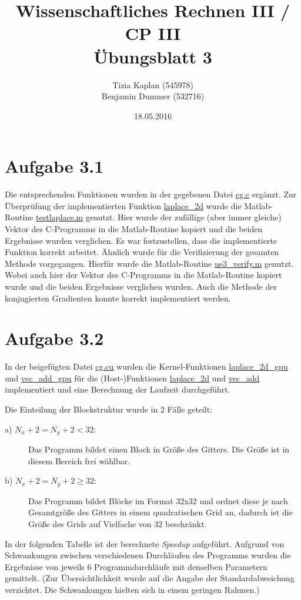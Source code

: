 \documentclass[%
	paper=A4,	%
	pagesize,	%
	DIV=calc,	%
	smallheadings,	%
	ngerman		%
]{scrartcl}
\title{{\bf Wissenschaftliches Rechnen III / CP III}\\Übungsblatt 3}
\author{Tizia Kaplan (545978)\\Benjamin Dummer (532716)}
\date{18.05.2016}
\begin{document}
\maketitle
\section*{Aufgabe 3.1}
Die entsprechenden Funktionen wurden in der gegebenen Datei \url{cg.c} ergänzt. Zur Überprüfung der implementierten Funktion \url{laplace\_2d} wurde die Matlab-Routine \url{testlaplace.m} genutzt. Hier wurde der \glqq zufällige \grqq (aber immer gleiche) Vektor des C-Programms in die Matlab-Routine kopiert und die beiden Ergebnisse wurden verglichen. Es war festzustellen, dass die implementierte Funktion korrekt arbeitet.
Ähnlich wurde für die Verifizierung der gesamten Methode vorgegangen. Hierfür wurde die Matlab-Routine \url{ue3_verify.m} genutzt. Wobei auch hier der Vektor des C-Programms in die Matlab-Routine kopiert wurde und die beiden Ergebnisse verglichen wurden. Auch die Methode der konjugierten Gradienten konnte korrekt implementiert werden.

\section*{Aufgabe 3.2}
In der beigefügten Datei \url{cg.cu} wurden die Kernel-Funktionen \url{laplace_2d_gpu} und \url{vec_add_gpu} für die (Host-)Funktionen \url{laplace_2d} und \url{vec_add} implementiert und eine Berechnung der Laufzeit durchgeführt. 

Die Einteilung der Blockstruktur wurde in 2 Fälle geteilt:
\begin{description}
	\item[a) $N_x+2=N_y+2<32$: ] Das Programm bildet einen Block in Größe des Gitters. Die Größe ist in diesem Bereich frei wählbar.
	\item[b) $N_x+2=N_y+2\geq 32$: ] Das Programm bildet Blöcke im Format $32$x$32$ und ordnet diese je nach Gesamtgröße des Gitters in einem quadratischen Grid an, dadurch ist die Größe des Grids auf Vielfache von $32$ beschränkt.
\end{description}

In der folgenden Tabelle ist der berechnete \emph{Speedup} aufgeführt. Aufgrund von Schwankungen zwischen verschiedenen Durchläufen des Programms wurden die Ergebnisse von jeweils 6 Programmdurchläufe mit denselben Parametern gemittelt. (Zur Übersichtlichkeit wurde auf die Angabe der Standardabweichung verzichtet. Die Schwankungen hielten sich in einem geringen Rahmen.)
\end{document}

